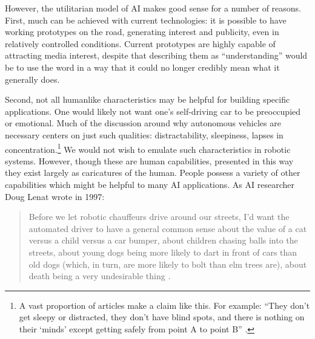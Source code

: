 


However, the utilitarian model of AI makes good sense for a number of reasons.
First, much can be achieved with current technologies:  it
is possible to have working prototypes on the road, generating
interest and publicity, even in relatively controlled conditions. Current
prototypes are highly capable of attracting media interest, despite
that describing them as 
``understanding'' would be to use the word in a way that it
could no longer credibly mean what it generally does. 

Second, not all humanlike characteristics may be helpful for building
specific applications. One would likely not want one's self-driving car
to be preoccupied or emotional. Much of the
discussion around why autonomous vehicles are necessary centers on
just such qualities: distractability, sleepiness, lapses in
concentration.\footnote{A vast proportion of articles make a claim
  like this. For example: ``They don't get sleepy or
  distracted, they don't have blind spots, and there is nothing on
  their `minds' except getting safely from point A to point B'' \cite{merrill}.} We
would not wish to emulate such 
characteristics in robotic systems. However, though these are human
capabilities, presented in this way they exist largely as caricatures
of the human. People possess a
variety of other capabilities which might be helpful to many AI
applications. As AI researcher Doug Lenat wrote in 1997:
\begin{quote}
Before we let robotic chauffeurs drive around our streets, I'd want the
  automated driver to have a general common sense about the value of a
cat versus a child versus a car bumper, about children chasing balls
into the streets, about young dogs being more likely to dart in front
of cars than old dogs (which, in turn, are more likely to bolt than
elm trees are), about death being a very undesirable thing \cite[p.
  122]{ekbia}.\end{quote} 


